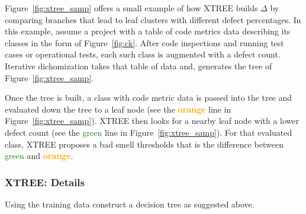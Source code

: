 \documentclass[twocolumn,5p]{elsarticle}
\newcommand{\fig}[1]{Figure~\ref{fig:#1}}
\theoremstyle{break}
\begin{document}
	\fig{xtree_samp} offers
	a small example of how XTREE builds
	$\Delta$ by comparing branches that lead to leaf clusters
	with different defect percentages. In this example, assume a project with a table of code metrics data describing its classes in the form of \fig{ck}. After code inspections and running test cases or operational
	tests, each such class is augmented with a defect count.
	Iterative dichomization takes that table of data and, 
	generates the tree of \fig{xtree_samp}.
	
	Once the tree is built, a class with code metric data is passed into the tree and evaluated down the tree to a leaf node (see the \textcolor{orange}{{\bf orange}} line in \fig{xtree_samp}).
	XTREE then looks for a nearby leaf node with a lower defect
	count (see the \textcolor{green}{{green}} line in \fig{xtree_samp}). For that evaluated class, XTREE proposes a bad smell
	thresholds that is  the difference between 
	\textcolor{green}{{green}} and \textcolor{orange}{{\bf orange}}. 
	
	
	\subsubsection{XTREE:   Details}
	
	Using the training data construct a decision tree as suggested above.
	
	
\end{document}

